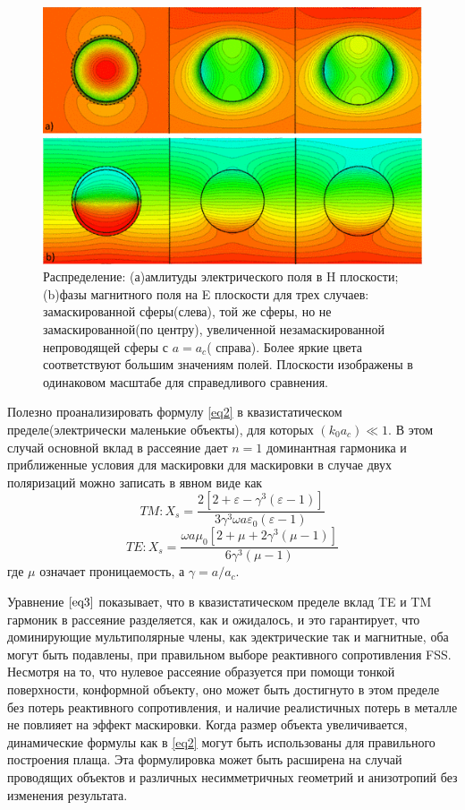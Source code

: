 \documentclass[12pt,a4paper]{article}
\begin{document}
\begin{figure}[t]
  \centering
  \includegraphics[height=0.16\paperheight, width=0.4\paperwidth]{3.png}
  \caption{Распределение: (а)амлитуды электрического поля в H плоскости;(b)фазы магнитного 
  поля на E плоскости для трех случаев: замаскированной сферы(слева), той же сферы, но не 
  замаскированной(по центру), увеличенной незамаскированной непроводящей сферы с $a=a_c$(
  справа). Более яркие цвета соответствуют большим значениям полей. Плоскости изображены в 
  одинаковом масштабе для справедливого сравнения.}
  \label{fig:3}
\end{figure}

Полезно проанализировать формулу \ref{eq2} в квазистатическом пределе(электрически маленькие 
объекты), для которых $(k_0a_c) \ll 1$. В этом случай основной вклад в рассеяние дает
$n=1$ доминантная гармоника и приближенные условия для маскировки для маскировки в 
случае двух поляризаций можно записать в явном виде как
\begin{equation*}
TM:X_s = 
\frac{2[2+\varepsilon-\gamma^3(\varepsilon-1)]}{3\gamma^3\omega a\varepsilon_0(\varepsilon-1)
}
\end{equation*}
\begin{equation}\label{eq3}
TE:X_s = \frac{\omega a\mu_0[2+\mu+2\gamma^3(\mu-1)]}{6\gamma^3(\mu-1)}
\end{equation}
где $\mu$ означает проницаемость, а $\gamma=a/a_c$.

Уравнение $\ref{eq3}$ показывает, что в квазистатическом пределе вклад TE и TM гармоник в 
рассеяние разделяется, как и ожидалось, и это гарантирует, что доминирующие мультиполярные
члены, как эдектрические так и магнитные, оба могут быть подавлены, при правильном выборе
реактивного сопротивления FSS. Несмотря на то, что нулевое рассеяние образуется при помощи 
тонкой поверхности, конформной объекту, оно может быть достигнуто в этом пределе без потерь 
реактивного сопротивления, и наличие реалистичных потерь в металле не повлияет на эффект 
маскировки. Когда размер объекта увеличивается, динамические формулы как в \ref{eq2} могут
быть использованы для правильного построения плаща. Эта формулировка может быть расширена на
случай проводящих объектов и различных несимметричных геометрий и анизотропий без изменения
результата.
\end{document}
